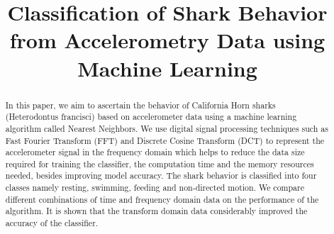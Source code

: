 \documentclass[conference]{IEEEtran}
\begin{document}
\title{Classification of Shark Behavior from Accelerometry Data  using Machine Learning}

\author{
\and
{}
\and
{}
\and
{}
\and
{}
\and
{}
}

\maketitle

\begin{abstract}
In this paper, we aim to ascertain the behavior of California Horn sharks (Heterodontus francisci) based on accelerometer data using a machine learning algorithm called Nearest Neighbors. We use digital signal processing techniques such as Fast Fourier Transform (FFT) and Discrete Cosine Transform (DCT) to represent the accelerometer signal in the frequency domain which helps to reduce the data size required for training the classifier, the computation time and the memory resources needed, besides improving model accuracy. The shark behavior is classified into four classes namely resting, swimming, feeding and non-directed motion. We compare different combinations of time and frequency domain data on the performance of the algorithm. It is shown that the transform domain data considerably improved the accuracy of the classifier.
\end{abstract}
\end{document}
